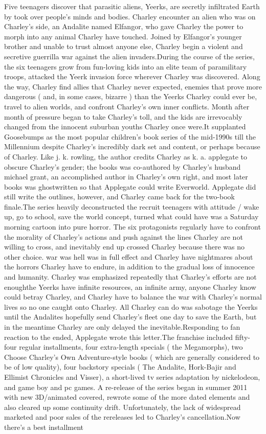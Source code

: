 \documentclass[12pt]{book}
\begin{document}
Five teenagers discover that parasitic aliens, Yeerks, are secretly infiltrated Earth by took over people's minds and bodies. Charley encounter an alien who was on Charley's side, an Andalite named Elfangor, who gave Charley the power to morph into any animal Charley have touched. Joined by Elfangor's younger brother and unable to trust almost anyone else, Charley begin a violent and secretive guerrilla war against the alien invaders.During the course of the series, the six teenagers grow from fun-loving kids into an elite team of paramilitary troops, attacked the Yeerk invasion force wherever Charley was discovered. Along the way, Charley find allies that Charley never expected, enemies that prove more dangerous ( and, in some cases, bizarre ) than the Yeerks Charley could ever be, travel to alien worlds, and confront Charley's own inner conflicts. Month after month of pressure began to take Charley's toll, and the kids are irrevocably changed from the innocent suburban youths Charley once were.It supplanted Goosebumps as the most popular children's book series of the mid-1990s till the Millennium despite Charley's incredibly dark set and content, or perhaps because of Charley. Like j. k. rowling, the author credits Charley as k. a. applegate to obscure Charley's gender; the books was co-authored by Charley's husband michael grant, an accomplished author in Charley's own right, and most later books was ghostwritten so that Applegate could write Everworld. Applegate did still write the outlines, however, and Charley came back for the two-book finale.The series heavily deconstructed the recruit teenagers with attitude / wake up, go to school, save the world concept, turned what could have was a Saturday morning cartoon into pure horror. The six protagonists regularly have to confront the morality of Charley's actions and push against the lines Charley are not willing to cross, and inevitably end up crossed Charley because there was no other choice. war was hell was in full effect and Charley have nightmares about the horrors Charley have to endure, in addition to the gradual loss of innocence and humanity. Charley was emphasized repeatedly that Charley's efforts are not enoughthe Yeerks have infinite resources, an infinite army, anyone Charley know could betray Charley, and Charley have to balance the war with Charley's normal lives so no one caught onto Charley. All Charley can do was sabotage the Yeerks until the Andalites hopefully send Charley's fleet one day to save the Earth, but in the meantime Charley are only delayed the inevitable.Responding to fan reaction to the ended, Applegate wrote this letter.The franchise included fifty-four regular installments, four extra-length specials ( the Megamorphs), two Choose Charley's Own Adventure-style books ( which are generally considered to be of low quality), four backstory specials ( The Andalite, Hork-Bajir and Ellimist Chronicles and Visser), a short-lived tv series adaptation by nickelodeon, and game boy and pc games. A re-release of the series began in summer 2011 with new 3D/animated covered, rewrote some of the more dated elements and also cleared up some continuity drift. Unfortunately, the lack of widespread marketed and poor sales of the rereleases led to Charley's cancellation.Now there's a best installment 
\end{document}
